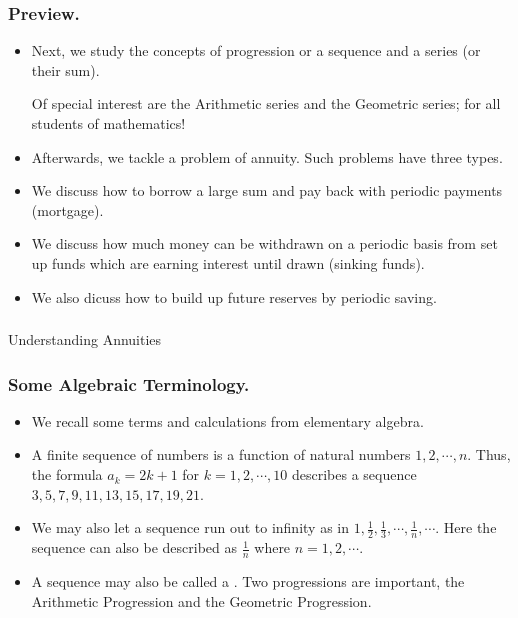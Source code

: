 \begin{frame}%
  \frametitle{Preview.}
  \begin{itemize}%
\item Next, we study the concepts of progression or a sequence and a
series (or their sum).

Of special interest are the Arithmetic series and the Geometric series;
 for all students of mathematics!

\item Afterwards, we tackle a problem of annuity. Such problems have three types.
\item We discuss how to  borrow a large sum and pay back with periodic payments
(mortgage).
\item
We discuss  how much money can be
withdrawn on a periodic basis from set up funds which are earning
interest until drawn (sinking funds).

\item  We also dicuss how to build up future reserves by periodic
saving.
 

\end{itemize}
\end{frame}

 \begin{frame}[fragile]\frametitle{}
\begin{center}
{\Large Understanding Annuities}

\end{center}
\end{frame}

\begin{frame} %

  \frametitle{Some Algebraic Terminology.}
 \begin{itemize}%
\item We recall some terms and calculations from elementary algebra.

\item A finite sequence of numbers is a function of natural numbers $1,2,\cdots , n$.
Thus, the formula $a_k=2k+1$ for $k=1,2,\cdots , 10$ describes a
sequence $3,5,7,9,11,13,15,17,19,21$.

\item We may also let a sequence run out to infinity as in
$1, \frac{1}{2}, \frac{1}{3},\cdots ,\frac{1}{n}, \cdots $.
Here the sequence can also be described as $\frac{1}{n}$ where
$n=1,2,\cdots $.

\item A sequence may also be called a .
Two progressions are important, the Arithmetic Progression and the
Geometric Progression.




\end{itemize}
\end{frame}

